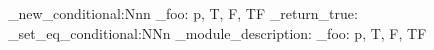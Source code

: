 \prg_new_conditional:Nnn
  \example_foo:
  { p, T, F, TF }
  { \prg_return_true: }
\prg_set_eq_conditional:NNn
  \_module_description:  %
  \example_foo:
  { p, T, F, TF }
